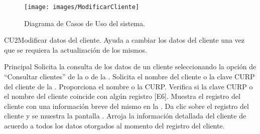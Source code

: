 

\begin{figure}[htbp!]
		\centering
			\texttt{[image: images/ModificarCliente]}
		\caption{Diagrama de Casos de Uso del sistema.}
	\end{figure}

	\begin{UseCase}{CU2}{Modificar datos del cliente.}{
		Ayuda a cambiar los datos del cliente una vez que se requiera la actualización de los mismos.
	}
	\end{UseCase}

	\begin{UCtrayectoria}{Principal}
		\UCpaso[\UCactor] Solicita la consulta de los datos de un cliente seleccionando la opción de ``Consultar clientes'' de la  o de la  .
		\UCpaso Solicita el nombre del cliente o la clave CURP del cliente de la .
		\UCpaso[\UCactor] Proporciona el nombre o la CURP.
		\UCpaso Verifica si la clave CURP o el nombre del cliente coincide con algún registro [E6].
		\UCpaso Muestra el registro del cliente con una información breve del mismo en la .
		\UCpaso[\UCactor] Da clic sobre el registro del cliente y se muestra la pantalla .
		\UCpaso Arroja la información detallada del cliente de acuerdo a todos los datos otorgados al momento del registro del cliente.
		
	\end{UCtrayectoria}
	

		

	